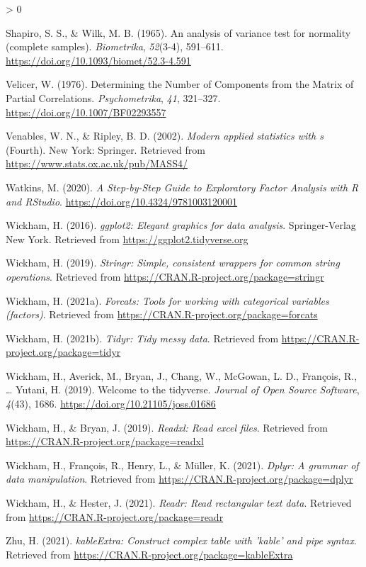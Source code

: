 \documentclass[
  english,
  man]{apa6}
\newlength{\cslhangindent}
\newenvironment{CSLReferences}[2] %
 {%
  \setlength{\parindent}{0pt}
  \ifodd #1 \everypar{\setlength{\hangindent}{\cslhangindent}}\ignorespaces\fi
  \ifnum #2 > 0
  \setlength{\parskip}{#2\baselineskip}
  \fi
 }%
 {}
\begin{document}
\begin{CSLReferences}{1}{0}
\leavevmode\hypertarget{ref-shapiroAnalysisVarianceTest1965}{}%
Shapiro, S. S., \& Wilk, M. B. (1965). An analysis of variance test for normality (complete samples). \emph{Biometrika}, \emph{52}(3-4), 591--611. \url{https://doi.org/10.1093/biomet/52.3-4.591}

\leavevmode\hypertarget{ref-velicerDeterminingNumberComponents1976}{}%
Velicer, W. (1976). Determining the {Number} of {Components} from the {Matrix} of {Partial Correlations}. \emph{Psychometrika}, \emph{41}, 321--327. \url{https://doi.org/10.1007/BF02293557}

\leavevmode\hypertarget{ref-R-MASS}{}%
Venables, W. N., \& Ripley, B. D. (2002). \emph{Modern applied statistics with s} (Fourth). New York: Springer. Retrieved from \url{https://www.stats.ox.ac.uk/pub/MASS4/}

\leavevmode\hypertarget{ref-watkinsStepbyStepGuideExploratory2020}{}%
Watkins, M. (2020). \emph{A {Step}-by-{Step Guide} to {Exploratory Factor Analysis} with {R} and {RStudio}}. \url{https://doi.org/10.4324/9781003120001}

\leavevmode\hypertarget{ref-R-ggplot2}{}%
Wickham, H. (2016). \emph{ggplot2: Elegant graphics for data analysis}. Springer-Verlag New York. Retrieved from \url{https://ggplot2.tidyverse.org}

\leavevmode\hypertarget{ref-R-stringr}{}%
Wickham, H. (2019). \emph{Stringr: Simple, consistent wrappers for common string operations}. Retrieved from \url{https://CRAN.R-project.org/package=stringr}

\leavevmode\hypertarget{ref-R-forcats}{}%
Wickham, H. (2021a). \emph{Forcats: Tools for working with categorical variables (factors)}. Retrieved from \url{https://CRAN.R-project.org/package=forcats}

\leavevmode\hypertarget{ref-R-tidyr}{}%
Wickham, H. (2021b). \emph{Tidyr: Tidy messy data}. Retrieved from \url{https://CRAN.R-project.org/package=tidyr}

\leavevmode\hypertarget{ref-R-tidyverse}{}%
Wickham, H., Averick, M., Bryan, J., Chang, W., McGowan, L. D., François, R., \ldots{} Yutani, H. (2019). Welcome to the {tidyverse}. \emph{Journal of Open Source Software}, \emph{4}(43), 1686. \url{https://doi.org/10.21105/joss.01686}

\leavevmode\hypertarget{ref-R-readxl}{}%
Wickham, H., \& Bryan, J. (2019). \emph{Readxl: Read excel files}. Retrieved from \url{https://CRAN.R-project.org/package=readxl}

\leavevmode\hypertarget{ref-R-dplyr}{}%
Wickham, H., François, R., Henry, L., \& Müller, K. (2021). \emph{Dplyr: A grammar of data manipulation}. Retrieved from \url{https://CRAN.R-project.org/package=dplyr}

\leavevmode\hypertarget{ref-R-readr}{}%
Wickham, H., \& Hester, J. (2021). \emph{Readr: Read rectangular text data}. Retrieved from \url{https://CRAN.R-project.org/package=readr}

\leavevmode\hypertarget{ref-R-kableExtra}{}%
Zhu, H. (2021). \emph{kableExtra: Construct complex table with 'kable' and pipe syntax}. Retrieved from \url{https://CRAN.R-project.org/package=kableExtra}

\end{CSLReferences}

\endgroup
\end{document}

